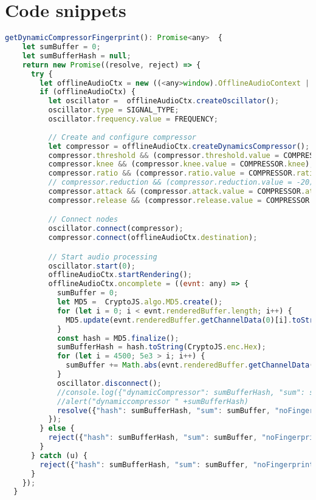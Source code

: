 

\chapter{Code snippets}
\label{chap:codesnippets}

\begin{lstlisting}[language=JavaScript, caption=DynamicCompressor fingerprint generation code, label=dynamicCompressorFingerprintGenerationCode]
  getDynamicCompressorFingerprint(): Promise<any>  {
    let sumBuffer = 0;
    let sumBufferHash = null;
    return new Promise((resolve, reject) => {
      try {
        let offlineAudioCtx = new ((<any>window).OfflineAudioContext || (<any>window).webkitOfflineAudioContext)(OFFLINEAUDIOCTX.numberOfChannels, OFFLINEAUDIOCTX.length, OFFLINEAUDIOCTX.sampleRate);
        if (offlineAudioCtx) {
          let oscillator =  offlineAudioCtx.createOscillator();
          oscillator.type = SIGNAL_TYPE;
          oscillator.frequency.value = FREQUENCY;
          
          // Create and configure compressor
          let compressor = offlineAudioCtx.createDynamicsCompressor();
          compressor.threshold && (compressor.threshold.value = COMPRESSOR.threshold);
          compressor.knee && (compressor.knee.value = COMPRESSOR.knee);
          compressor.ratio && (compressor.ratio.value = COMPRESSOR.ratio);
          // compressor.reduction && (compressor.reduction.value = -20);
          compressor.attack && (compressor.attack.value = COMPRESSOR.attack);
          compressor.release && (compressor.release.value = COMPRESSOR.release);

          // Connect nodes
          oscillator.connect(compressor);
          compressor.connect(offlineAudioCtx.destination);

          // Start audio processing
          oscillator.start(0);
          offlineAudioCtx.startRendering();
          offlineAudioCtx.oncomplete = ((evnt: any) => {
            sumBuffer = 0;
            let MD5 =  CryptoJS.algo.MD5.create();
            for (let i = 0; i < evnt.renderedBuffer.length; i++) {
              MD5.update(evnt.renderedBuffer.getChannelData(0)[i].toString());
            }
            const hash = MD5.finalize();
            sumBufferHash = hash.toString(CryptoJS.enc.Hex);
            for (let i = 4500; 5e3 > i; i++) {
              sumBuffer += Math.abs(evnt.renderedBuffer.getChannelData(0)[i]);
            }
            oscillator.disconnect();
            //console.log({"dynamicCompressor": sumBufferHash, "sum": sumBuffer});
            //alert("dynamiccompressor " +sumBufferHash)
            resolve({"hash": sumBufferHash, "sum": sumBuffer, "noFingerprint": false});
          });
        } else {
          reject({"hash": sumBufferHash, "sum": sumBuffer, "noFingerprint": true});
        }
      } catch (u) {
        reject({"hash": sumBufferHash, "sum": sumBuffer, "noFingerprint": true});
      }
    });
  }
\end{lstlisting}

